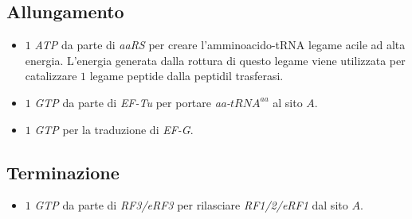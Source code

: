 \subsection{Allungamento}
\begin{itemize}
	\item $1$ \emph{ATP} da parte di \emph{aaRS} per creare l'amminoacido-tRNA legame acile ad alta energia. L'energia generata dalla rottura di questo legame viene utilizzata per
		catalizzare $1$ legame peptide dalla peptidil trasferasi.
	\item $1$ \emph{GTP} da parte di \emph{EF-Tu} per portare \emph{aa-$tRNA^{aa}$} al sito $A$.
	\item $1$ \emph{GTP} per la traduzione di \emph{EF-G}.
\end{itemize}
\subsection{Terminazione}
\begin{itemize}
	\item $1$ \emph{GTP} da parte di \emph{RF3/eRF3} per rilasciare \emph{RF1/2/eRF1} dal sito $A$. 
\end{itemize}
